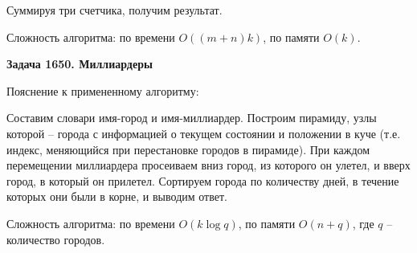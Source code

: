\documentclass[12pt,a4paper]{article}
\begin{document}
    Суммируя три счетчика, получим результат.

    Сложность алгоритма: по времени $O((m+n)k)$, по памяти $O(k)$.

    \bigskip

    \textbf{Задача 1650. Миллиардеры}

    Пояснение к примененному алгоритму:

    Составим словари имя-город и имя-миллиардер.
    Построим пирамиду, узлы которой -- города с информацией о текущем состоянии и положении в куче
    (т.е. индекс, меняющийся при перестановке городов в пирамиде).
    При каждом перемещении миллиардера просеиваем вниз город, из которого он улетел, и вверх город,
    в который он прилетел.
    Сортируем города по количеству дней, в течение которых они были в корне, и выводим ответ.

    Сложность алгоритма: по времени $O(k\log q)$, по памяти $O(n+q)$, где $q$ -- количество городов.
\end{document}
